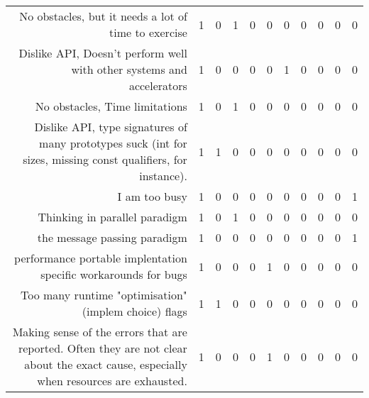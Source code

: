 {\begin{landscape}
\begin{longtable}[htb]{r|c|c|c|c|c|c|c|c|c|c}
{No obstacles, but it needs a lot of time to exercise} & 1 & 0 & 1 & 0 & 0 & 0 & 0 & 0 & 0 & 0 \\%
{Dislike API, Doesn't perform well with other systems and accelerators} & 1 & 0 & 0 & 0 & 0 & 1 & 0 & 0 & 0 & 0 \\%
{No obstacles, Time limitations} & 1 & 0 & 1 & 0 & 0 & 0 & 0 & 0 & 0 & 0 \\%
{Dislike API, type signatures of many prototypes suck (int for sizes, missing const qualifiers, for instance).} & 1 & 1 & 0 & 0 & 0 & 0 & 0 & 0 & 0 & 0 \\%
{I am too busy} & 1 & 0 & 0 & 0 & 0 & 0 & 0 & 0 & 0 & 1 \\%
{Thinking in parallel paradigm} & 1 & 0 & 1 & 0 & 0 & 0 & 0 & 0 & 0 & 0 \\%
{the message passing paradigm} & 1 & 0 & 0 & 0 & 0 & 0 & 0 & 0 & 0 & 1 \\%
{performance portable  implentation specific workarounds for bugs} & 1 & 0 & 0 & 0 & 1 & 0 & 0 & 0 & 0 & 0 \\%
{Too many runtime "optimisation" (implem choice) flags} & 1 & 1 & 0 & 0 & 0 & 0 & 0 & 0 & 0 & 0 \\%
{Making sense of the errors that are reported. Often they are not clear about the exact cause, especially when resources are exhausted.} & 1 & 0 & 0 & 0 & 1 & 0 & 0 & 0 & 0 & 0 \\%
\hline%
\end{longtable}%
\end{landscape}}%
\clearpage%
